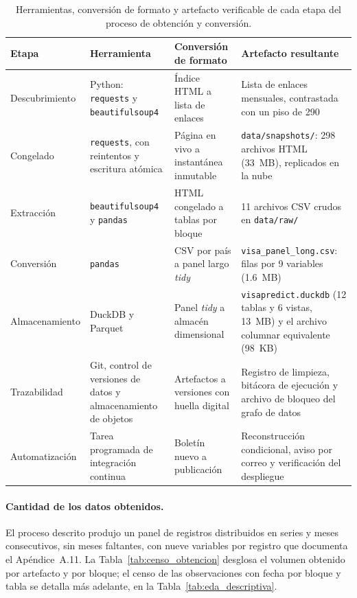 \documentclass[12pt,letterpaper]{report}
\begin{document}
\begin{table}[H]
\centering
\footnotesize
\caption[Herramientas, formatos y artefactos por etapa]{Herramientas, conversión de formato y
artefacto verificable de cada etapa del proceso de obtención y conversión.}
\label{tab:herramientas}
\begin{tabular}{p{2.5cm}p{2.95cm}p{3.55cm}p{4.45cm}}
\toprule
\rowcolor{uacjblue!15}
\textbf{Etapa} & \textbf{Herramienta} & \textbf{Conversión de formato} & \textbf{Artefacto resultante} \\ \midrule
Descubrimiento & Python: \texttt{requests} y \texttt{beautifulsoup4} & Índice HTML a lista de enlaces & Lista de enlaces mensuales, contrastada con un piso de 290 \\
Congelado & \texttt{requests}, con reintentos y escritura atómica & Página en vivo a instantánea inmutable & \texttt{data/snapshots/}: 298 archivos HTML (33~MB), replicados en la nube \\
Extracción & \texttt{beautifulsoup4} y \texttt{pandas} & HTML congelado a tablas por bloque & 11 archivos CSV crudos en \texttt{data/raw/} \\
Conversión & \texttt{pandas} & CSV por país a panel largo \textit{tidy} & \texttt{visa\_panel\_long.csv}: \factNObsFmt{} filas por 9 variables (1.6~MB) \\
Almacenamiento & DuckDB y Parquet & Panel \textit{tidy} a almacén dimensional & \texttt{visapredict.duckdb} (12 tablas y 6 vistas, 13~MB) y el archivo columnar equivalente (98~KB) \\
Trazabilidad & Git, control de versiones de datos y almacenamiento de objetos & Artefactos a versiones con huella digital & Registro de limpieza, bitácora de ejecución y archivo de bloqueo del grafo de datos \\
Automatización & Tarea programada de integración continua & Boletín nuevo a publicación & Reconstrucción condicional, aviso por correo y verificación del despliegue \\
\bottomrule
\end{tabular}
\end{table}

\paragraph{Cantidad de los datos obtenidos.} El proceso descrito produjo un panel de
\factNObsFmt{} registros distribuidos en \factNSeriesStructural{} series y \factNMonths{}
meses consecutivos, sin meses faltantes, con nueve variables por registro que documenta el
Apéndice~A.11. La Tabla~\ref{tab:censo_obtencion} desglosa el volumen obtenido por
artefacto y por bloque; el censo de las observaciones con fecha por bloque y tabla se
detalla más adelante, en la Tabla~\ref{tab:eda_descriptiva}.
\end{document}
